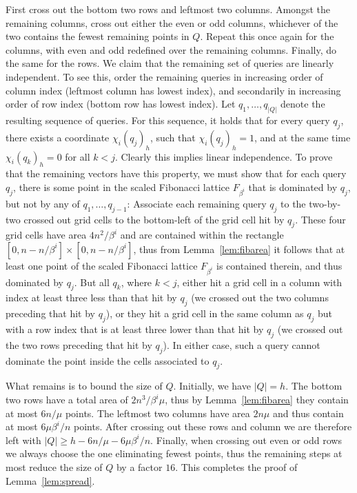 \documentclass[letterpaper]{article}
\newcommand{\inc}[1]{\chi_{#1}}
\begin{document}
First cross out the bottom two rows and leftmost two columns. Amongst
the remaining columns, cross out either the even or odd columns,
whichever of the two contains the fewest remaining points in
$Q$. Repeat this once again for the columns, with even and odd
redefined over the remaining columns. Finally, do the same for the
rows. We claim that the remaining set of queries are linearly
independent. To see this, order the remaining queries in increasing
order of column index (leftmost column has lowest index), and
secondarily in increasing order of row index (bottom row has lowest
index). Let $q_1,\dots,q_{|Q|}$ denote the resulting sequence of
queries. For this sequence, it holds that for every query $q_j$, there
exists a coordinate $\inc{i}(q_j)_h$, such that $\inc{i}(q_j)_h=1$,
and at the same time $\inc{i}(q_k)_h=0$ for all $k < j$. Clearly this
implies linear independence. To prove that the remaining vectors have
this property, we must show that for each query $q_j$, there is some
point in the scaled Fibonacci lattice $F_{\beta^i}$ that is dominated
by $q_j$, but not by any of $q_1,\dots,q_{j-1}$: Associate each
remaining query $q_j$ to the two-by-two crossed out grid cells to the
bottom-left of the grid cell hit by $q_j$. These four grid cells have
area $4n^2/\beta^i$ and are contained within the rectangle
$[0,n-n/\beta^i] \times [0,n-n/\beta^i]$, thus from
Lemma~\ref{lem:fibarea} it follows that at least one point of the
scaled Fibonacci lattice $F_{\beta^i}$ is contained therein, and thus
dominated by $q_j$. But all $q_k$, where $k<j$, either hit a grid cell
in a column with index at least three less than that hit by $q_j$ (we
crossed out the two columns preceding that hit by $q_j$), or they hit
a grid cell in the same column as $q_j$ but with a row index that is
at least three lower than that hit by $q_j$ (we crossed out the two
rows preceding that hit by $q_j$). In either case, such a query
cannot dominate the point inside the cells associated to $q_j$.

What remains is to bound the size of $Q$. Initially, we have
$|Q|=h$. The bottom two rows have a total area of $2n^3/\beta^i \mu$,
thus by Lemma~\ref{lem:fibarea} they contain at most $6n/\mu$
points. The leftmost two columns have area $2n\mu$ and thus contain at
most $6\mu\beta^i/n$ points. After crossing out these rows and column
we are therefore left with $|Q| \geq h-6n/\mu-6\mu\beta^i/n$. Finally,
when crossing out even or odd rows we always choose the one
eliminating fewest points, thus the remaining steps at most reduce the
size of $Q$ by a factor $16$. This completes the proof of
Lemma~\ref{lem:spread}.
\end{document}

